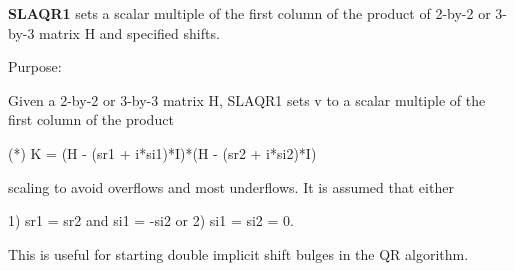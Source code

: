 {\bfseries S\+L\+A\+Q\+R1} sets a scalar multiple of the first column of the product of 2-\/by-\/2 or 3-\/by-\/3 matrix H and specified shifts. 

 \begin{DoxyParagraph}{Purpose\+: }
\begin{DoxyVerb}      Given a 2-by-2 or 3-by-3 matrix H, SLAQR1 sets v to a
      scalar multiple of the first column of the product

      (*)  K = (H - (sr1 + i*si1)*I)*(H - (sr2 + i*si2)*I)

      scaling to avoid overflows and most underflows. It
      is assumed that either

              1) sr1 = sr2 and si1 = -si2
          or
              2) si1 = si2 = 0.

      This is useful for starting double implicit shift bulges
      in the QR algorithm.\end{DoxyVerb}
 
\end{DoxyParagraph}

